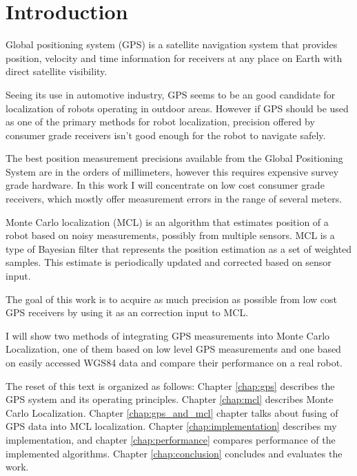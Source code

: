 \chapter{Introduction}






Global positioning system (GPS) is a satellite navigation system that
provides position, velocity and time information for receivers at any place on Earth with direct
satellite visibility.

Seeing its use in automotive industry, GPS seems to be an good candidate for
localization of robots operating in outdoor areas.
However if GPS should be used as one of the primary methods for robot localization,
precision offered by consumer grade receivers isn't good enough for the robot to navigate safely.

The best position measurement precisions available from the Global Positioning System
are in the orders of millimeters,
however this requires expensive survey grade hardware.
In this work I will concentrate on low cost consumer grade receivers, which mostly
offer measurement errors in the range of several meters.



Monte Carlo localization (MCL) is an algorithm that estimates position of a robot
based on noisy measurements, possibly from multiple sensors.
MCL is a type of Bayesian filter that represents the position estimation as a
set of weighted samples.
This estimate is periodically updated and corrected based on sensor input.




The goal of this work is to acquire as much precision as possible from low cost
GPS receivers by using it as an correction input to MCL.

I will show two methods of integrating GPS measurements into Monte Carlo Localization,
one of them based on low level GPS measurements and one based on easily accessed WGS84 data
and compare their performance on a real robot.



The reset of this text is organized as follows:
Chapter \ref{chap:gps} describes the GPS system and its operating principles.
Chapter \ref{chap:mcl} describes Monte Carlo Localization.
Chapter \ref{chap:gps_and_mcl} chapter talks about fusing of GPS data into
MCL localization.
Chapter \ref{chap:implementation} describes my implementation,
and chapter \ref{chap:performance} compares performance of the implemented algorithms.
Chapter \ref{chap:conclusion} concludes and evaluates the work.
